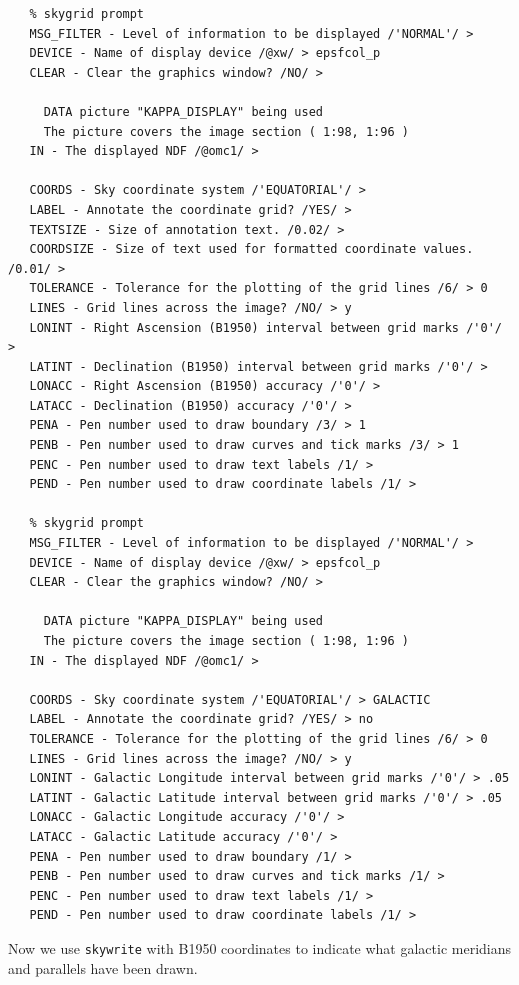 \documentclass[11pt]{article}
\begin{document}
\begin{verbatim}
   % skygrid prompt
   MSG_FILTER - Level of information to be displayed /'NORMAL'/ >
   DEVICE - Name of display device /@xw/ > epsfcol_p
   CLEAR - Clear the graphics window? /NO/ >

     DATA picture "KAPPA_DISPLAY" being used
     The picture covers the image section ( 1:98, 1:96 )
   IN - The displayed NDF /@omc1/ >

   COORDS - Sky coordinate system /'EQUATORIAL'/ >
   LABEL - Annotate the coordinate grid? /YES/ >
   TEXTSIZE - Size of annotation text. /0.02/ >
   COORDSIZE - Size of text used for formatted coordinate values. /0.01/ >
   TOLERANCE - Tolerance for the plotting of the grid lines /6/ > 0
   LINES - Grid lines across the image? /NO/ > y
   LONINT - Right Ascension (B1950) interval between grid marks /'0'/ >
   LATINT - Declination (B1950) interval between grid marks /'0'/ >
   LONACC - Right Ascension (B1950) accuracy /'0'/ >
   LATACC - Declination (B1950) accuracy /'0'/ >
   PENA - Pen number used to draw boundary /3/ > 1
   PENB - Pen number used to draw curves and tick marks /3/ > 1
   PENC - Pen number used to draw text labels /1/ >
   PEND - Pen number used to draw coordinate labels /1/ >

   % skygrid prompt
   MSG_FILTER - Level of information to be displayed /'NORMAL'/ >
   DEVICE - Name of display device /@xw/ > epsfcol_p
   CLEAR - Clear the graphics window? /NO/ >

     DATA picture "KAPPA_DISPLAY" being used
     The picture covers the image section ( 1:98, 1:96 )
   IN - The displayed NDF /@omc1/ >

   COORDS - Sky coordinate system /'EQUATORIAL'/ > GALACTIC
   LABEL - Annotate the coordinate grid? /YES/ > no
   TOLERANCE - Tolerance for the plotting of the grid lines /6/ > 0
   LINES - Grid lines across the image? /NO/ > y
   LONINT - Galactic Longitude interval between grid marks /'0'/ > .05
   LATINT - Galactic Latitude interval between grid marks /'0'/ > .05
   LONACC - Galactic Longitude accuracy /'0'/ >
   LATACC - Galactic Latitude accuracy /'0'/ >
   PENA - Pen number used to draw boundary /1/ >
   PENB - Pen number used to draw curves and tick marks /1/ >
   PENC - Pen number used to draw text labels /1/ >
   PEND - Pen number used to draw coordinate labels /1/ >
\end{verbatim}

   Now we use {\tt skywrite} with B1950 coordinates to indicate what
   galactic meridians and parallels have been drawn.
\end{document}
